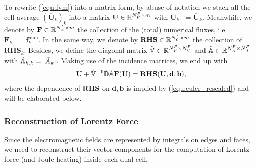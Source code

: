 \documentclass{article}
\begin{document}
To rewrite (\ref{equ:fvm}) into a matrix form, by abuse of notation we stack all the cell average $(\overline{\mathbf{U}}_k)_k$ into a matrix $\mathbf{U} \in \mathbb{R}^{N_{\Tilde{V}}^P \times m}$ with $\mathbf{U}_{k,:} = \overline{\mathbf{U}}_k$. Meanwhile, we denote by $\mathbf{F} \in \mathbb{R}^{N_{\Tilde{A}}^P \times m}$ the collection of the (total) numerical fluxes, i.e. $\mathbf{F}_{k,:} = \mathbf{f}^\text{num}_k$. In the same way, we denote by $\mathbf{RHS}\in \mathbb{R}^{N_{\Tilde{V}}^P \times m}$ the collection of $\overline{\mathbf{RHS}}_k$. Besides, we define the diagonal matrix $\mathbb{\Tilde{V}} \in \mathbb{R}^{N_{\Tilde{V}}^P \times N_{\Tilde{V}}^P}$ and $\mathbb{\Tilde{A}}\in \mathbb{R}^{N_{\Tilde{A}}^P \times N_{\Tilde{A}}^P}$ with $\mathbb{\Tilde{A}}_{k,k} = |\Tilde{A}_k|$. Making use of the incidence matrices, we end up with
\begin{equation*}
    \dot{\mathbf{U}} + \mathbb{\Tilde{V}}^{-1}\mathbb{\Tilde{D}}\mathbb{\Tilde{A}}\mathbf{F}(\mathbf{U})  = \mathbf{RHS}(\mathbf{U},\mathbf{d},\mathbf{b}),
\end{equation*}
where the dependence of $\mathbf{RHS}$ on $\mathbf{d}, \mathbf{b}$ is implied by (\ref{equ:euler_rescaled}) and will be elaborated below.

\subsubsection{Reconstruction of Lorentz Force}
Since the electromagnetic fields are represented by integrals on edges and faces, we need to reconstruct their vector components for the computation of Lorentz force (and Joule heating) inside each dual cell.    
\end{document}

